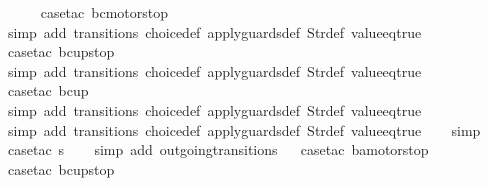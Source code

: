 \begin{isabellebody}
\ \ \ \ \isamarkupfalse%
\ {\isacharparenleft}case{\isacharunderscore}tac\ {\isachardoublequoteopen}bc{\isacharequal}motorstop{}{\isachardoublequoteclose}{\isacharparenright}\isanewline
\ \ \ \ \ \isamarkupfalse%
\ {\isacharparenleft}simp\ add{\isacharcolon}\ transitions\ choice{\isacharunderscore}def\ apply{\isacharunderscore}guards{\isacharunderscore}def\ Str{\isacharunderscore}def\ value{\isacharunderscore}eq{\isacharunderscore}true{\isacharparenright}\isanewline
\ \ \ \ \isamarkupfalse%
\ {\isacharparenleft}case{\isacharunderscore}tac\ {\isachardoublequoteopen}bc{\isacharequal}up{}{}stop{\isachardoublequoteclose}{\isacharparenright}\isanewline
\ \ \ \ \ \isamarkupfalse%
\ {\isacharparenleft}simp\ add{\isacharcolon}\ transitions\ choice{\isacharunderscore}def\ apply{\isacharunderscore}guards{\isacharunderscore}def\ Str{\isacharunderscore}def\ value{\isacharunderscore}eq{\isacharunderscore}true{\isacharparenright}\isanewline
\ \ \ \ \isamarkupfalse%
\ {\isacharparenleft}case{\isacharunderscore}tac\ {\isachardoublequoteopen}bc{\isacharequal}up{}{}{\isachardoublequoteclose}{\isacharparenright}\isanewline
\ \ \ \ \ \isamarkupfalse%
\ {\isacharparenleft}simp\ add{\isacharcolon}\ transitions\ choice{\isacharunderscore}def\ apply{\isacharunderscore}guards{\isacharunderscore}def\ Str{\isacharunderscore}def\ value{\isacharunderscore}eq{\isacharunderscore}true{\isacharparenright}\isanewline
\ \ \ \ \isamarkupfalse%
\ {\isacharparenleft}simp\ add{\isacharcolon}\ transitions\ choice{\isacharunderscore}def\ apply{\isacharunderscore}guards{\isacharunderscore}def\ Str{\isacharunderscore}def\ value{\isacharunderscore}eq{\isacharunderscore}true{\isacharparenright}\isanewline
\ \ \isamarkupfalse%
\ simp\isanewline
\ \ \isamarkupfalse%
\ {\isacharparenleft}case{\isacharunderscore}tac\ {\isachardoublequoteopen}s{\isacharequal}{}{\isachardoublequoteclose}{\isacharparenright}\isanewline
\ \ \isamarkupfalse%
\ {\isacharparenleft}simp\ add{\isacharcolon}\ outgoing{\isacharunderscore}transitions{\isacharunderscore}{}{\isacharparenright}\isanewline
\ \isamarkupfalse%
\ {\isacharparenleft}case{\isacharunderscore}tac\ {\isachardoublequoteopen}ba{\isacharequal}motorstop{}{\isachardoublequoteclose}{\isacharparenright}\isanewline
\ \ \ \ \isamarkupfalse%
\ {\isacharparenleft}case{\isacharunderscore}tac\ {\isachardoublequoteopen}bc{\isacharequal}up{}{}stop{\isachardoublequoteclose}{\isacharparenright}\isanewline

\end{isabellebody}
